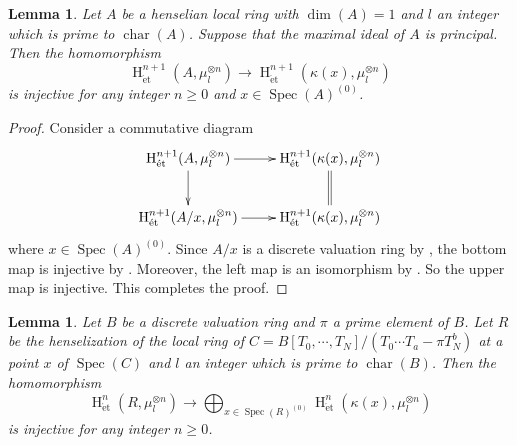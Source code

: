 \documentclass{article}
\newtheorem{lem}[thm]{\indent \sc Lemma}
\newcommand{\spec}{\operatorname{Spec}}
\newcommand{\et}{\mathrm{\acute{e}t}}
\newcommand{\HO}{\operatorname{H}}
\begin{document}
%
\begin{lem}\upshape\label{injpr}
Let $A$ be a henselian local ring with 
$\operatorname{dim}(A)=1$ and $l$ an integer which is prime to $\operatorname{char}(A)$.  
Suppose that the maximal ideal of $A$ is principal. Then the homomorphism
%
\begin{equation*}
\HO^{n+1}_{\et}(A, \mu_{l}^{\otimes n})
\to
\HO^{n+1}_{\et}(
\kappa(x),
\mu_{l}^{\otimes n}
)
\end{equation*}
%
is injective for any integer $n\geq 0$ and $x\in \spec(A)^{(0)}$.
\end{lem}
%

%
\begin{proof}\upshape
Consider a commutative diagram
%
\begin{equation*}
\xymatrix{
\HO^{n+1}_{\et}(
A,
\mu_{l}^{\otimes n}
)
\ar[r]\ar[d]
&
\HO^{n+1}_{\et}(
\kappa(x),
\mu_{l}^{\otimes n}
)
\ar@{=}[d]
\\
\HO^{n+1}_{\et}(
A/x,
\mu_{l}^{\otimes n}
)
\ar[r]
&
\HO^{n+1}_{\et}(
\kappa(x),
\mu_{l}^{\otimes n}
)
}    
\end{equation*}
%
where $x\in \spec(A)^{(0)}$. Since $A/x$ is a discrete valuation ring 
by \cite[p.78, Theorem 11.1]{Ma}, 
the bottom map
is injective by \cite[Theorem B.2.1 and Examples B.1.1.(2)]{C-H-K}. 
Moreover, the left map is an isomorphism 
by \cite[p.777, The proof of Proposition 2.2.b)]{Ge}.
So the upper map is injective. This completes the proof.
\end{proof}
%



%
\begin{lem}\upshape\label{nrhenij}
Let $B$ be a discrete valuation ring and $\pi$ a prime element of $B$. Let $R$ 
be the henselization of the local ring of
%
\begin{math}
C=B[T_{0}, \cdots, T_{N}]
/(T_{0}\cdots T_{a}-\pi T_{N}^{b})    
\end{math}
%
at a point $x$ of $\spec(C)$
and $l$ an integer which is prime to $\operatorname{char}(B)$.
%
Then the homomorphism
%
\begin{equation}\label{homnr}
\HO^{n}_{\et}(R, \mu_{l}^{\otimes n})
\to
\displaystyle\bigoplus_{x\in \spec(R)^{(0)}}
\HO^{n}_{\et}(
\kappa(x),
\mu_{l}^{\otimes n}
)
\end{equation}
%
is injective for any integer $n\geq 0$.
\end{lem}
%
\end{document}
